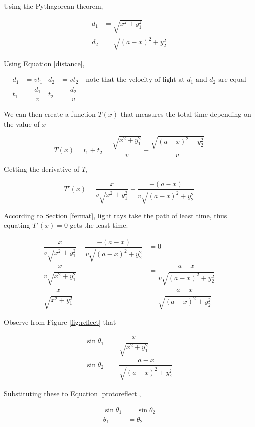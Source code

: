 \documentclass[a4paper,12pt]{article}
\begin{document}
Using the Pythagorean theorem,

\begin{align}
d_1 &= \sqrt{x^2 + y_1^2} \nonumber\\
d_2 &= \sqrt{(a-x)^2 +y_2^2} \nonumber
\end{align}

Using Equation \eqref{distance},

\begin{align}
d_1 &= vt_1 & d_2 &= vt_2 & \text{ note that the velocity of light at } d_1 \text{ and } d_2 \text{ are equal} \nonumber\\
t_1 &= \dfrac{d_1}{v} & t_2 &= \dfrac{d_2}{v}
\end{align}

We can then create a function $T(x)$ that measures the total time depending on the value of $x$

\begin{equation} 
T(x) = t_1 + t_2 = \dfrac{\sqrt{x^2 +y_1^2}}{v} + \dfrac{\sqrt{(a-x)^2 + y_2^2}}{v}
\end{equation}

Getting the derivative of $T$,

\begin{equation}
T'(x) = \dfrac{x}{v\sqrt{x^2 + y_1^2}} + \dfrac{-(a-x)}{v\sqrt{(a-x)^2 + y_2^2}}
\end{equation}

According to Section \ref{fermat}, light rays take the path of least time, thus equating $T'(x) = 0$ gets the least time.

\begin{align}
\dfrac{x}{v\sqrt{x^2 + y_1^2}} + \dfrac{-(a-x)}{v\sqrt{(a-x)^2 + y_2^2}} &= 0 \nonumber\\
\dfrac{x}{v\sqrt{x^2 + y_1^2}} &= \dfrac{a-x}{v\sqrt{(a-x)^2 + y_2^2}}\nonumber\\
\dfrac{x}{\sqrt{x^2 + y_1^2}} &= \dfrac{a-x}{\sqrt{(a-x)^2 + y_2^2}} \label{protoreflect}
\end{align}

Observe from Figure \ref{fig:reflect} that

\begin{align}
\sin \theta_1 &= \dfrac{x}{\sqrt{x^2 + y_1^2}} \\
\sin \theta_2 &= \dfrac{a-x}{\sqrt{(a-x)^2 + y_2^2}} 
\end{align}

Substituting these to Equation \eqref{protoreflect},

\begin{align}
\sin \theta_1 &= \sin \theta_2 \nonumber\\
\theta_1 &= \theta_2 \label{reflect}
\end{align}
\end{document}

